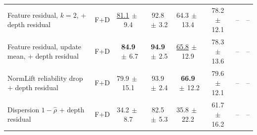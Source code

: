 \documentclass[journal]{IEEEtran}
\begin{document}
\begin{table}[t]
\begin{tabular}{@{}llcccccc@{}}
Feature residual, $k=2$, + depth residual & F+D & \underline{81.1}{\scriptsize$\,\pm\,$9.4} & 92.8{\scriptsize$\,\pm\,$3.2} & 64.3{\scriptsize$\,\pm\,$13.4} & 78.2{\scriptsize$\,\pm\,$12.1} & -- & --\\
Feature residual, update mean, + depth residual & F+D & \textbf{84.9}{\scriptsize$\,\pm\,$6.7} & \textbf{94.9}{\scriptsize$\,\pm\,$2.5} & \underline{65.8}{\scriptsize$\,\pm\,$12.9} & 78.3{\scriptsize$\,\pm\,$13.6} & -- & --\\
NormLift reliability drop + depth residual & F+D & 79.9{\scriptsize$\,\pm\,$15.1} & 93.9{\scriptsize$\,\pm\,$2.4} & \textbf{66.9}{\scriptsize$\,\pm\,$12.2} & 79.6{\scriptsize$\,\pm\,$12.1} & -- & --\\
Dispersion $1-\hat\rho$ + depth residual & F+D & 34.2{\scriptsize$\,\pm\,$8.7} & 82.5{\scriptsize$\,\pm\,$5.3} & 35.8{\scriptsize$\,\pm\,$22.2} & 61.7{\scriptsize$\,\pm\,$16.2} & -- & --\\
\bottomrule
\end{tabular}
\end{table}
\end{document}
